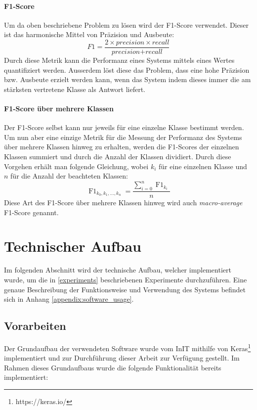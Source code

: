\paragraph{F1-Score} Um da oben beschriebene Problem zu lösen wird der F1-Score verwendet. Dieser ist das harmonische Mittel von Präzision und Ausbeute:
\begin{equation}
\label{basic:metrics:f1_eq}
F1 = \frac{2 \times \textit{precision} \times recall}{\textit{precision} + \textit{recall}}
\end{equation}
Durch diese Metrik kann die Performanz eines Systems mittels eines Wertes quantifiziert werden. Ausserdem löst diese das Problem, dass eine hohe Präzision bzw. Ausbeute erzielt werden kann, wenn das System  indem dieses immer die am stärksten vertretene Klasse als Antwort liefert.
\paragraph{F1-Score über mehrere Klassen} Der F1-Score selbst kann nur jeweils für eine einzelne Klasse bestimmt werden. Um nun aber eine einzige Metrik für die Messung der Performanz des Systems über mehrere Klassen hinweg zu erhalten, werden die F1-Scores der einzelnen Klassen summiert und durch die Anzahl der Klassen dividiert. Durch diese Vorgehen erhält man folgende Gleichung, wobei $k_i$ für eine einzelnen Klasse und $n$ für die Anzahl der beachteten Klassen:
\begin{equation}
\operatorname{F1}_{k_0, k_1, \dots, k_n} = \frac{\sum_{i=0}^{n} \operatorname{F1}_{k_i}}{n}
\end{equation}
Diese Art des F1-Score über mehrere Klassen hinweg wird auch \emph{macro-average} F1-Score genannt.

\section{Technischer Aufbau}
Im folgenden Abschnitt wird der technische Aufbau, welcher implementiert wurde, um die in \ref{experiments} beschriebenen Experimente durchzuführen. Eine genaue Beschreibung der Funktionsweise und Verwendung des Systems befindet sich in Anhang \ref{appendix:software_usage}.

\subsection{Vorarbeiten}
\label{technichal_setup:prework}
Der Grundaufbau der verwendeten Software wurde vom InIT mithilfe von Keras\footnote{https://keras.io/} implementiert und zur Durchführung dieser Arbeit zur Verfügung gestellt. Im Rahmen dieses Grundaufbaus wurde die folgende Funktionalität bereits implementiert:

